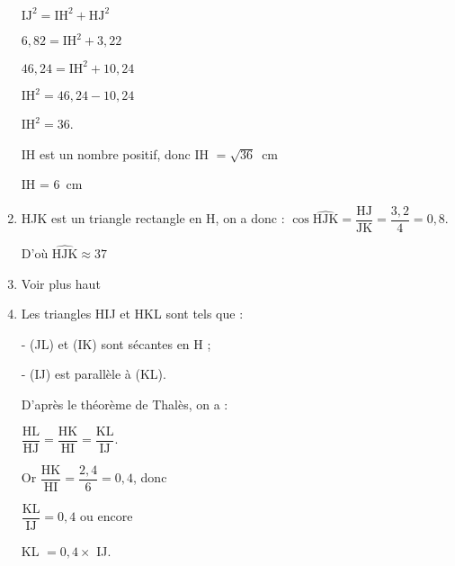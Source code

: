 \begin{enumerate}
$\text{IJ}^2 = \text{IH}^2 + \text{HJ}^2$

$6,82 = \text{IH}^2 + 3,22$

$46,24 = \text{IH}^2 + 10,24$

$\text{IH}^2 = 46,24 - 10,24$

$\text{IH}^2 = 36$.

IH est un nombre positif, donc IH $= \sqrt{36}$~cm

IH = $6$~cm
\item %
HJK est un triangle rectangle en H, on a donc : $\cos \widehat{\text{HJK}} = \dfrac{\text{HJ}}{\text{JK}} = \dfrac{3,2}{4} = 0,8$.

D'où $\widehat{\text{HJK}} \approx  37$~\degres
\item %
Voir plus haut
\item %
Les triangles HIJ et HKL sont tels que :

- (JL) et (IK) sont sécantes en H ;

- (IJ) est parallèle à (KL).

D’après le théorème de Thalès, on a :

$\dfrac{\text{HL}}{\text{HJ}} = \dfrac{\text{HK}}{\text{HI}}= \dfrac{
\text{KL}}{\text{IJ}}$.

Or $\dfrac{\text{HK}}{\text{HI}}= \dfrac{2,4}{6} = 0,4$, donc 

$\dfrac{\text{KL}}{\text{IJ}} = 0,4$ ou encore

KL $= 0,4 \times$ IJ.
\end{enumerate}

\vspace{0,5cm}

